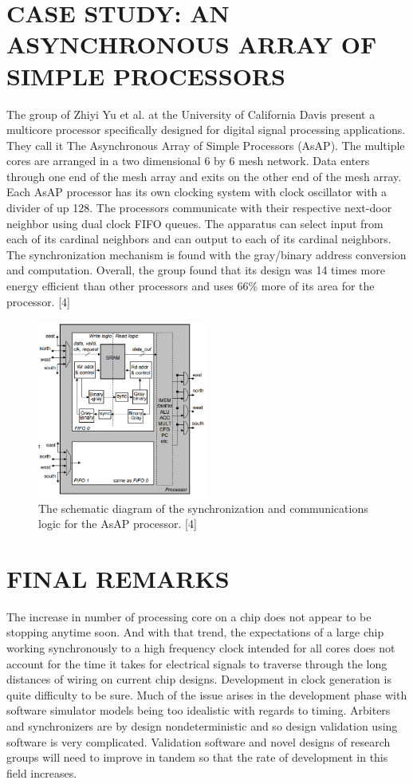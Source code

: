 \documentclass[letterpaper, 10 pt, conference]{ieeeconf}
\begin{document}
\section{CASE STUDY: AN ASYNCHRONOUS ARRAY OF SIMPLE PROCESSORS}

The group of Zhiyi Yu et al. at the University of California Davis present a multicore processor specifically designed for digital signal processing applications.  They call it The Asynchronous Array of Simple Processors (AsAP).  The multiple cores are arranged in a two dimensional 6 by 6 mesh network.  Data enters through one end of the mesh array and exits on the other end of the mesh array.  Each AsAP processor has its own clocking system with clock oscillator with a divider of up 128.  The processors communicate with their respective next-door neighbor using dual clock FIFO queues.  The apparatus can select input from each of its cardinal neighbors and can output to each of its cardinal neighbors.  The synchronization mechanism is found with the gray/binary address conversion and computation.  Overall, the group found that its design was 14 times more energy efficient than other processors and uses 66\% more of its area for the processor. [4]

\begin{figure}[!ht] %
	\centering
	\includegraphics [width=0.5\textwidth] {Node_IO.PNG} 
    \caption{The schematic diagram of the synchronization and communications logic for the AsAP processor. [4]}
\end{figure}

\section{FINAL REMARKS}

The increase in number of processing core on a chip does not appear to be stopping anytime soon.  And with that trend, the expectations of a large chip working synchronously to a high frequency clock intended for all cores does not account for the time it takes for electrical signals to traverse through the long distances of wiring on current chip designs.  Development in clock generation is quite difficulty to be sure.  Much of the issue arises in the development phase with software simulator models being too idealistic with regards to timing.  Arbiters and synchronizers are by design nondeterministic and so design validation using software is very complicated.  Validation software and novel designs of research groups will need to improve in tandem so that the rate of development in this field increases.
\end{document}
